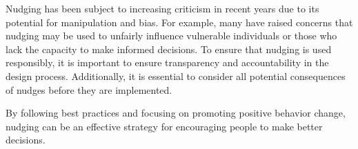 Nudging has been subject to increasing criticism in recent years due to its potential for manipulation and bias. For example, many have raised concerns that nudging may be used to unfairly influence vulnerable individuals or those who lack the capacity to make informed decisions. To ensure that nudging is used responsibly, it is important to ensure transparency and accountability in the design process. Additionally, it is essential to consider all potential consequences of nudges before they are implemented. 


By following best practices and focusing on promoting positive behavior change, nudging can be an effective strategy for encouraging people to make better decisions. 

 
